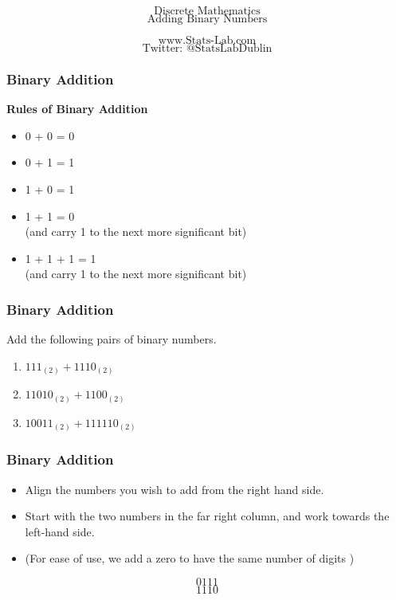 \documentclass{beamer}
\begin{document}
\begin{frame}

\huge
\[ \mbox{Discrete Mathematics}\]
\[ \mbox{Adding Binary Numbers}\]

\Large
\[ \mbox{www.Stats-Lab.com}\]
\[ \mbox{Twitter: @StatsLabDublin}\]

\end{frame}
\begin{frame}
\frametitle{Binary Addition}
\Large
\vspace{-2cm}
\textbf{Rules of Binary Addition}
\begin{itemize}
\item 0 + 0 = 0
\item 0 + 1 = 1
\item 1 + 0 = 1
\item 1 + 1 = 0 \\ (and carry 1 to the next more significant bit)
\item 1 + 1 + 1 = 1 \\ (and carry 1 to the next more significant bit)
\end{itemize}
\end{frame}
\begin{frame}
\frametitle{Binary Addition}
\Large
\vspace{-2cm}
Add the following pairs of binary numbers.
\vspace{0.3cm}
\begin{enumerate}
\item $111_{(2)} + 1110_{(2)}$ 
\vspace{0.3cm}
\item $11010_{(2)} + 1100_{(2)}$
\vspace{0.3cm}
\item $10011_{(2)} + 111110_{(2)}$
\end{enumerate}

\end{frame}
\begin{frame}
\frametitle{Binary Addition}
\Large
\vspace{-2.2cm}
\begin{itemize}
\item Align the numbers you wish to add from the right hand side.
\item Start with the two numbers in the far right column, and work towards the left-hand side.
\large
\item (For ease of use, we add a zero to have the same number of digits
)
\end{itemize}
\LARGE
\[ 0 1 1 1\]
\[ 1 1 1 0\]
\end{frame}
\end{document}
